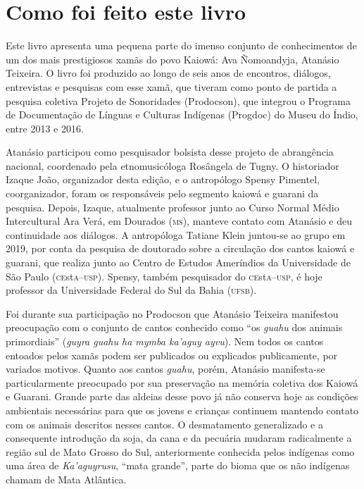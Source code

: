 \chapter{Como foi feito este livro}

Este livro apresenta uma pequena parte do imenso conjunto de
conhecimentos de um dos mais prestigiosos xamãs do povo Kaiowá: Ava
Ñomoandyja, Atanásio Teixeira. O livro foi produzido ao longo de seis
anos de encontros, diálogos, entrevistas e pesquisas com esse xamã, que
tiveram como ponto de partida a pesquisa coletiva Projeto de Sonoridades
(Prodocson), que integrou o Programa de Documentação de Línguas e
Culturas Indígenas (Progdoc) do Museu do Índio, entre 2013 e 2016.

Atanásio participou como pesquisador bolsista desse projeto de
abrangência nacional, coordenado pela etnomusicóloga Rosângela de Tugny.
O historiador Izaque João, organizador desta edição, e o antropólogo
Spensy Pimentel, coorganizador, foram os responsáveis pelo segmento
kaiowá e guarani da pesquisa. Depois, Izaque, atualmente
professor junto ao Curso Normal Médio Intercultural Ara Verá, em
Dourados (\textsc{ms}), manteve contato com Atanásio e deu continuidade aos
diálogos. A antropóloga Tatiane Klein juntou-se ao grupo em 2019, por
conta da pesquisa de doutorado sobre a circulação dos cantos kaiowá e
guarani, que realiza junto ao Centro de Estudos Ameríndios da
Universidade de São Paulo (\textsc{ce}st\textsc{a}--\textsc{usp}). Spensy, também pesquisador do \textsc{ce}st\textsc{a}--\textsc{usp}, é hoje professor da Universidade Federal do Sul da Bahia (\textsc{ufsb}).

Foi durante sua participação no Prodocson que Atanásio Teixeira
manifestou preocupação com o conjunto de cantos conhecido como ``os
\textit{guahu} dos animais primordiais'' (\textit{guyra guahu ha
mymba ka'aguy ayvu}). Nem todos os cantos entoados pelos xamãs podem ser
publicados ou explicados publicamente, por variados motivos. Quanto aos
cantos \textit{guahu}, porém, Atanásio manifesta-se particularmente
preocupado por sua preservação na memória coletiva dos Kaiowá e Guarani.
Grande parte das aldeias desse povo já não conserva hoje as condições
ambientais necessárias para que os jovens e crianças continuem mantendo
contato com os animais descritos nesses cantos. O desmatamento
generalizado e a consequente introdução da soja, da cana e da pecuária
mudaram radicalmente a região sul de Mato Grosso do Sul, anteriormente
conhecida pelos indígenas como uma área de \textit{Ka'aguyrusu}, ``mata
grande'', parte do bioma que os não indígenas chamam de Mata Atlântica.

